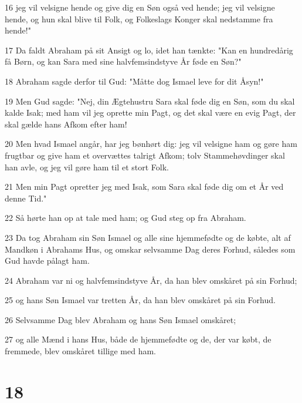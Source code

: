 \par 16 jeg vil velsigne hende og give dig en Søn også ved hende; jeg vil velsigne hende, og hun skal blive til Folk, og Folkeslags Konger skal nedstamme fra hende!"
\par 17 Da faldt Abraham på sit Ansigt og lo, idet han tænkte: "Kan en hundredårig få Børn, og kan Sara med sine halvfemsindstyve År føde en Søn?"
\par 18 Abraham sagde derfor til Gud: "Måtte dog Ismael leve for dit Åsyn!"
\par 19 Men Gud sagde: "Nej, din Ægtehustru Sara skal føde dig en Søn, som du skal kalde Isak; med ham vil jeg oprette min Pagt, og det skal være en evig Pagt, der skal gælde hans Afkom efter ham!
\par 20 Men hvad Ismael angår, har jeg bønhørt dig: jeg vil velsigne ham og gøre ham frugtbar og give ham et overvættes talrigt Afkom; tolv Stammehøvdinger skal han avle, og jeg vil gøre ham til et stort Folk.
\par 21 Men min Pagt opretter jeg med Isak, som Sara skal føde dig om et År ved denne Tid."
\par 22 Så hørte han op at tale med ham; og Gud steg op fra Abraham.
\par 23 Da tog Abraham sin Søn Ismael og alle sine hjemmefødte og de købte, alt af Mandkøn i Abrahams Hus, og omskar selvsamme Dag deres Forhud, således som Gud havde pålagt ham.
\par 24 Abraham var ni og halvfemsindstyve År, da han blev omskåret på sin Forhud;
\par 25 og hans Søn Ismael var tretten År, da han blev omskåret på sin Forhud.
\par 26 Selvsamme Dag blev Abraham og hans Søn Ismael omskåret;
\par 27 og alle Mænd i hans Hus, både de hjemmefødte og de, der var købt, de fremmede, blev omskåret tillige med ham.

\chapter{18}

